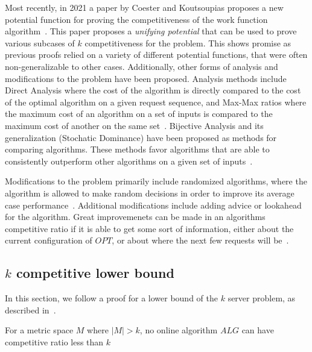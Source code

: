 Most recently, in 2021 a paper by Coester and Koutsoupias proposes a new potential function for proving the competitiveness of the work function algorithm~\cite{unifyingPotential2021}. This paper proposes a \textit{unifying potential} that can be used to prove various subcases of $k$ competitiveness for the \KS problem. This shows promise as previous proofs relied on a variety of different potential functions, that were often non-generalizable to other cases.
Additionally, other forms of analysis and modifications to the \KS problem have been proposed. Analysis methods include Direct Analysis where the cost of the algorithm is directly compared to the cost of the optimal algorithm on a given request sequence, and Max-Max ratios where the maximum cost of an algorithm on a set of inputs is compared to the maximum cost of another on the same set~\cite{MAXMAX2005}. Bijective Analysis and its generalization (Stochatic Dominance) have been proposed as methods for comparing algorithms. These methods favor algorithms that are able to consistently outperform other algorithms on a given set of inputs~\cite{bij2016}. 

Modifications to the \KS problem primarily include randomized algorithms, where the algorithm is allowed to make random decisions in order to improve its average case performance~\cite{OnlineComp1998}. Additional modifications include adding advice or lookahead for the algorithm. Great improvemenets can be made in an algorithms competitive ratio if it is able to get some sort of information, either about the current configuration of $OPT$, or about where the next few requests will be~\cite{advice2015}.

\subsection{$k$ competitive lower bound}
\label{sec:lowerBound}

In this section, we follow a proof for a lower bound of the $k$ server problem, as described in~\cite{server2009}.

\begin{lemma}
    For a metric space $M$ where $|M| > k$, no online algorithm $ALG$ can have competitive ratio less than $k$
\end{lemma}

